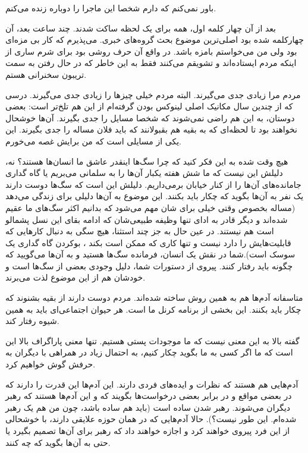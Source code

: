 باور نمی‌کنم که دارم شخصا این ماجرا را دوباره زنده می‌کنم. 

بعد از آن چهار کلمه اول، همه برای یک لحظه ساکت شدند. چند ساعت بعد، آن
چهارکلمه شده بود اصلی‌ترین موضوع بحث گروه‌های خبری. می‌پذیرم که کار بی
مزه‌ای بود ولی من می‌خواستم بامزه باشد. در واقع آن حرف روشی بود برای شرم
ساری از اینکه مردم ایستاده‌اند و تشویقم می‌کنند فقط به این خاطر که در
حال رفتن به سمت تریبون سخنرانی هستم.

مردم مرا زیادی جدی می‌گیرند. البته مردم خیلی‌ چیزها را زیادی جدی
می‌گیرند. درسی که از چندین سال مکانیک اصلی لینوکس بودن گرفته‌ام از این
هم تلخ‌تر است: بعضی دوستان، به این هم راضی نمی‌شوند که شخصا مسایل را جدی
بگیرند. آن‌ها خوشحال نخواهند بود تا لحظه‌ای که به بقیه هم بقبولانند که
باید فلان مساله را جدی بگیرند. این یکی از مسایلی است که من برایش غصه
می‌خورم.

هیچ وقت شده به این فکر کنید که چرا سگ‌ها اینقدر عاشق ما انسان‌ها هستند؟
نه، دلیلش این نیست که ما شش هفته یکبار آن‌ها را به سلمانی می‌بریم یا گاه
گداری جامانده‌های آن‌ها را از کنار خیابان برمی‌داریم. دلیلش این است که
سگ‌ها دوست دارند یک نفر به آن‌ها بگوید که چکار باید بکنند. این موضوع به
آن‌ها دلیلی برای زندگی می‌دهد (مساله بخصوص وقتی خیلی برای شان مهم می‌شود
که بدانیم اکثر سگ‌های ما عقیم شده‌اند و دیگر قادر به ادای تنها وظیفه
طبیعی‌شان که ادامه بقای این نسل پشمالو است هم نیستند. در عین حال به جز
چند استثنا، هیچ سگی به دنبال کارهایی که قابلیت‌هایش را دارد نیست و تنها
کاری که ممکن است بکند ، بوکردن گاه گداری یک سوسک است).شما در نقش یک
انسان، فرمانده سگ‌ها هستید و به آن‌ها می‌گویید که چگونه باید رفتار
کنند. پیروی از دستورات شما، دلیل وجودی بعضی از سگ‌ها است و خودشان هم از
این موضوع لذت می‌برند.

متاسفانه آدم‌ها هم به همین روش ساخته شده‌اند. مردم دوست دارند از بقیه
بشنوند که چکار باید بکنند. این بخشی از برنامه کرنل ما است. هر حیوان
اجتماعی‌ای باید به همین شیوه رفتار کند.

گفته بالا به این معنی نیست که ما موجودات پستی هستیم. تنها معنی
پاراگراف بالا این است که ما اگر کسی به ما بگوید چکار کنیم، به احتمال
زیاد در همراهی با دیگران به حرفش گوش خواهیم کرد.

آدم‌هایی هم هستند که نظرات و ایده‌های فردی دارند. این آدم‌ها این قدرت را
دارند که در بعضی مواقع و در برابر بعضی درخواست‌ها بگویند که
 و این آدم‌ها هستند که رهبر دیگران
می‌شوند. رهبر شدن ساده است (باید هم ساده باشد، چون من هم یک رهبر
شده‌ام. این طور نیست؟). حالا آدم‌هایی که در همان حوزه علایقی دارند، با
خوشحالی از این فرد پیروی خواهند کرد و اجازه خواهند داد که رهبر برای
آن‌ها تصمیم بگیرد یا حتی به آن‌ها بگوید که چه کنند.

